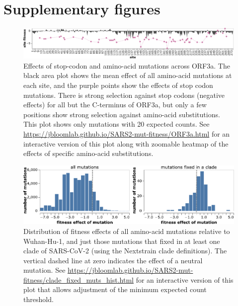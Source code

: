 \documentclass[9pt,twocolumn,twoside]{gsajnl_modified}
\begin{document}
\clearpage

\section{Supplementary figures}

\begin{figure}[h]
\includegraphics[width=\linewidth]{figs/ORF3a.pdf}
\caption{
Effects of stop-codon and amino-acid mutations across ORF3a.
The black area plot shows the mean effect of all amino-acid mutations at each site, and the purple points show the effects of stop codon mutations.
There is strong selection against stop codons (negative effects) for all but the C-terminus of ORF3a, but only a few positions show strong selection against amino-acid substitutions.
This plot shows only mutations with 20 expected counts.
See \url{https://jbloomlab.github.io/SARS2-mut-fitness/ORF3a.html} for an interactive version of this plot along with zoomable heatmap of the effects of specific amino-acid substitutions.
\label{fig:ORF3a}
}
\end{figure}

\begin{figure}
\centering
\includegraphics[width=0.7\linewidth]{figs/fixed_dist.pdf}
\caption{
Distribution of fitness effects of all amino-acid mutations relative to Wuhan-Hu-1, and just those mutations that fixed in at least one clade of SARS-CoV-2 (using the Nextstrain clade definitions).
The vertical dashed line at zero indicates the effect of a neutral mutation.
See \url{https://jbloomlab.github.io/SARS2-mut-fitness/clade_fixed_muts_hist.html} for an interactive version of this plot that allows adjustment of the minimum expected count threshold.
\label{fig:fixed_dist}
}
\end{figure}
\end{document}

